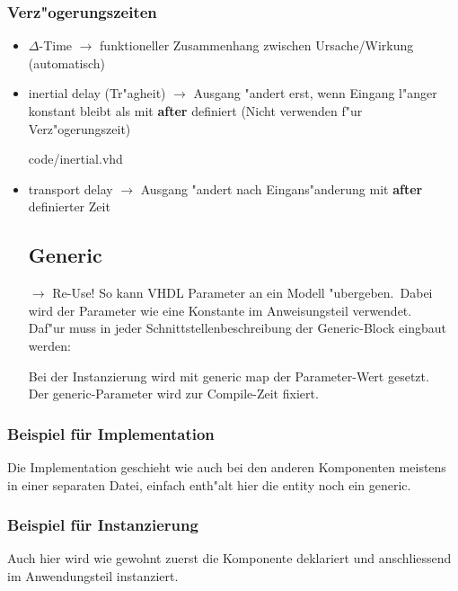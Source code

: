 \begin{multicols}{2}
	\subsubsection{Verz"ogerungszeiten}  %
	\begin{itemize}
		\itemsep0em
		\item $\Delta$-Time $\rightarrow$ funktioneller Zusammenhang 
			zwischen Ursache/Wirkung (automatisch)
		\item inertial delay (Tr"agheit) $\rightarrow$ Ausgang "andert erst, wenn Eingang l"anger konstant bleibt als mit \textbf{after} definiert (Nicht verwenden f"ur Verz"ogerungszeit)
		
				{code/inertial.vhd}
		\item transport delay $\rightarrow$ Ausgang "andert nach Eingans"anderung mit \textbf{after} definierter Zeit 
			
		\vfill\null
		\columnbreak	
		\subsection{Generic}
		$\rightarrow$ Re-Use! So kann VHDL Parameter an ein Modell 
		"ubergeben.\ Dabei wird der Parameter wie eine Konstante im Anweisungsteil verwendet.\\
		Daf"ur muss in jeder Schnittstellenbeschreibung der Generic-Block eingbaut werden:
		
		Bei der Instanzierung wird mit generic map der Parameter-Wert gesetzt.\\
		Der generic-Parameter wird zur Compile-Zeit fixiert.
		\vfill\null
	\end{itemize}
\end{multicols}
	
\begin{multicols}{2}


	\subsubsection{Beispiel für Implementation}
	Die Implementation geschieht wie auch bei den anderen 
	Komponenten meistens in einer separaten Datei, einfach enth"alt hier die entity noch ein generic.
	
	\vfill\null
	\columnbreak
	\subsubsection{Beispiel für Instanzierung}
	Auch hier wird wie gewohnt zuerst die Komponente deklariert und 
	anschliessend im Anwendungsteil instanziert.
	
\end{multicols}